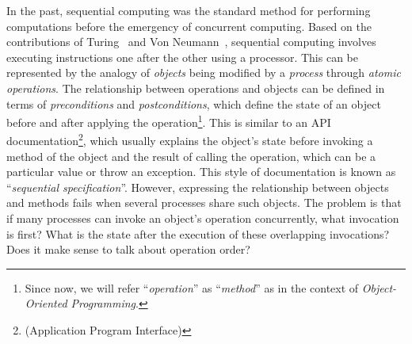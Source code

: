 In the past, sequential computing was the standard method for performing computations before the emergency of concurrent computing. Based on the contributions of  Turing~\cite{DBLP_journals_x_Turing37} and Von Neumann~\cite{DBLP_journals_annals_Neumann93}, sequential computing involves executing instructions one after the other using a processor. This can be represented by the analogy of \textit{objects} being modified by a \textit{process} through \textit{atomic operations}. The relationship between operations and objects can be defined in terms of \textit{preconditions} and \textit{postconditions}, which define the state of an object before and after applying the operation\footnote{Since now, we will refer ``\textit{operation}'' as ``\textit{method}'' as in the context of \textit{Object-Oriented Programming}.}. This is similar to an API documentation\footnote{(Application Program Interface)}, which usually explains the object's state before invoking a method of the object and the result of calling the operation, which can be a particular value or throw an exception. This style of documentation is known as ``\textit{sequential specification}''.
However, expressing the relationship between objects and methods fails when several processes share such objects. The problem is that if many processes can invoke an object's operation concurrently, what invocation is first? What is the state after the execution of these overlapping invocations? Does it make sense to talk about operation order?

